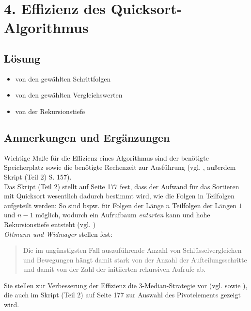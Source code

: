 \chapter{4. Effizienz des Quicksort-Algorithmus}

\section*{Lösung}

\begin{itemize}
    \item von den gewählten Schrittfolgen
    \item von den gewählten Vergleichswerten
    \item von der Rekursionstiefe
\end{itemize}


\section*{Anmerkungen und Ergänzungen}

Wichtige Maße für die Effizienz eines Algorithmus sind der benötigte Speicherplatz sowie die benötigte Rechenzeit zur Ausführung (vgl. \cite[2]{OW17a}, außerdem Skript (Teil 2) S. 157).
\\
Das Skript (Teil 2) stellt auf Seite 177 fest, dass der Aufwand für das Sortieren mit Quicksort wesentlich dadurch bestimmt wird, wie die Folgen in Teilfolgen aufgeteilt werden: So sind bspw. für Folgen der Länge $n$ Teilfolgen der Längen $1$ und $n-1$ möglich, wodurch ein Aufrufbaum \textit{entarten} kann und hohe Rekursionstiefe entsteht (vgl. \cite[177 f.]{GD18e})
\\

\textit{Ottmann und Widmayer} stellen fest:

\blockquote[{\cite[96]{OW17b}}]{
    Die im ungünstigsten Fall auszuführende Anzahl von Schlüsselvergleichen und Bewegungen
    hängt damit stark von der Anzahl der Aufteilungsschritte und damit von der Zahl der
    initiierten rekursiven Aufrufe ab.
}

Sie stellen zur Verbesserung der Effizienz die 3-Median-Strategie vor (vgl. \cite[102]{OW17b} sowie \cite[183]{GD18e}), die auch im Skript (Teil 2) auf Seite 177 zur Auswahl des Pivotelements gezeigt wird.